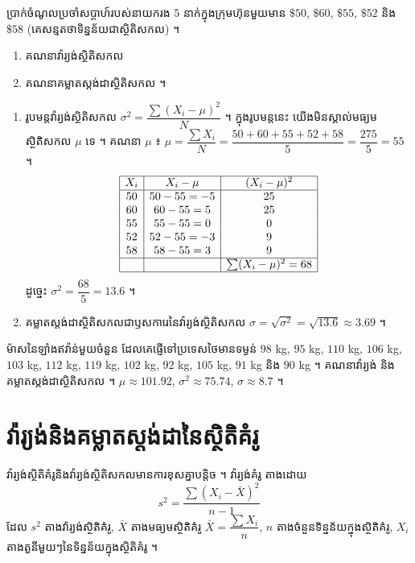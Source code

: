 \begin{example}[លំហាត់គំរូ ២]
ប្រាក់ចំណូលប្រចាំសប្ដាហ៍របស់នាយករង $5$ នាក់ក្នុងក្រុមហ៊ុនមួយមាន $\$50$, $\$60$, $\$55$, $\$52$ និង $\$58$ (គេសន្មតថាទិន្នន័យជាស្ថិតិសកល) ។
\begin{enumerate}[a]
  \item គណនាវ៉ារ្យង់ស្ថិតិសកល
  \item គណនាគម្លាតស្តង់ដាស្ថិតិសកល ។
\end{enumerate}
\ans
\begin{enumerate}[a]
  \item រូបមន្តវ៉ារ្យង់ស្ថិតិសកល $\sigma^2 = \dfrac{\sum(X_i - \mu)^2}{N}$ ។ ក្នុងរូបមន្តនេះ យើងមិនស្គាល់មធ្យមស្ថិតិសកល $\mu$ ទេ ។ គណនា $\mu$ ៖ $\mu = \dfrac{\sum X_i}{N} = \dfrac{50 + 60 + 55 + 52 + 58}{5} = \dfrac{275}{5} = 55$ ។
  \[
  \begin{array}{|c|c|c|}\hline
  X_i & X_i - \mu & (X_i - \mu)^2\\ \hline
  50 & 50 - 55 = -5 & 25\\
  60 & 60 - 55 = 5 & 25\\
  55 & 55 - 55 = 0 & 0\\
  52 & 52 - 55 = -3 & 9\\
  58 & 58 - 55 = 3 & 9\\ \hline
   & & \sum(X_i - \mu)^2 = 68\\ \hline
  \end{array}
  \]
  ដូច្នេះ $\sigma^2 = \dfrac{68}{5} = 13.6$ ។
  \item គម្លាតស្តង់ដាស្ថិតិសកលជាឫសការេនៃវ៉ារ្យង់ស្ថិតិសកល $\sigma = \sqrt{\sigma^2} = \sqrt{13.6} \approx 3.69$ ។
\end{enumerate}
\end{example}

\begin{pro}
ម៉ាសនៃឡាំងឥវ៉ាន់មួយចំនួន ដែលគេផ្ញើទៅប្រទេសថៃមានទម្ងន់ $98$ kg, $95$ kg, $110$ kg, $106$ kg, $103$ kg, $112$ kg, $119$ kg, $102$ kg, $92$ kg, $105$ kg, $91$ kg និង $90$ kg ។ គណនាវ៉ារ្យង់ និងគម្លាតស្តង់ដាស្ថិតិសកល ។
\ans
$\mu \approx 101.92$, $\sigma^2 \approx 75.74$, $\sigma \approx 8.7$ ។
\end{pro}

\section{វ៉ារ្យង់និងគម្លាតស្តង់ដានៃស្ថិតិគំរូ}
វ៉ារ្យង់ស្ថិតិគំរូនិងវ៉ារ្យង់ស្ថិតិសកលមានការខុសគ្នាបន្តិច ។ វ៉ារ្យង់គំរូ តាងដោយ
\[
s^2 = \frac{\sum(X_i - \bar{X})^2}{n - 1}
\]
ដែល $s^2$ តាងវ៉ារ្យង់ស្ថិតិគំរូ, $\bar{X}$ តាងមធ្យមស្ថិតិគំរូ $\bar{X} = \dfrac{\sum X_i}{n}$, $n$ តាងចំនួនទិន្នន័យក្នុងស្ថិតិគំរូ, $X_i$ តាងតួនីមួយៗនៃទិន្នន័យក្នុងស្ថិតិគំរូ ។


